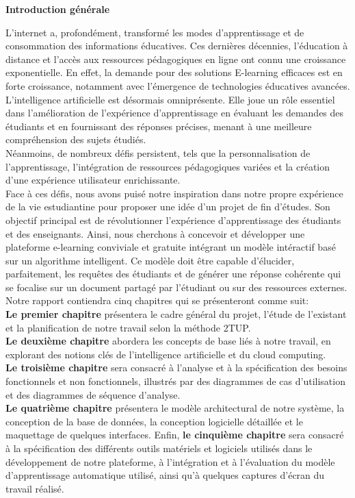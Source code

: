 \thispagestyle{empty}
\begin{center}
  \textbf{\Huge Introduction générale}
\end{center}

\noindent L'internet a, profondément, transformé les modes d'apprentissage et de consommation des informations éducatives. Ces dernières décennies, l'éducation à distance et l'accès aux ressources pédagogiques en ligne ont connu une croissance exponentielle. En effet, la demande pour des solutions E-learning efficaces est en forte croissance, notamment avec l'émergence de technologies éducatives avancées. L’intelligence artificielle est désormais omniprésente. Elle joue un rôle essentiel dans l'amélioration de l'expérience d'apprentissage en évaluant les demandes des étudiants et en fournissant des réponses précises, menant à une meilleure compréhension des sujets étudiés.\\
\noindent Néanmoins, de nombreux défis persistent, tels que la personnalisation de l'apprentissage, l'intégration de ressources pédagogiques variées et la création d'une expérience utilisateur enrichissante. \\
\noindent Face à ces défis, nous avons puisé notre inspiration dans notre propre expérience de la vie estudiantine pour proposer une idée d’un projet de fin d’études. Son objectif principal est de révolutionner l'expérience d'apprentissage des étudiants et des enseignants. Ainsi, nous cherchons à concevoir et développer une plateforme e-learning conviviale et gratuite intégrant un modèle intéractif basé sur un algorithme intelligent. Ce modèle doit être capable d'élucider, parfaitement, les requêtes des étudiants et de générer une réponse cohérente qui se focalise sur un document partagé par l’étudiant ou sur des ressources externes. \\
\noindent Notre rapport contiendra cinq chapitres qui se présenteront comme suit: \\
\textbf{Le premier chapitre} présentera le cadre général du projet, l'étude de l'existant et la planification de notre travail selon la méthode 2TUP.\\
\textbf{Le deuxième chapitre} abordera les concepts de base liés à notre travail, en explorant des notions clés de l'intelligence artificielle et du cloud computing.\\
\textbf{Le troisième chapitre} sera consacré à l'analyse et à la spécification des besoins fonctionnels et non fonctionnels, illustrés par des diagrammes de cas d'utilisation et des diagrammes de séquence d'analyse.\\
\textbf{Le quatrième chapitre} présentera le modèle architectural de notre système, la conception de la base de données, la conception logicielle détaillée et le maquettage de quelques interfaces. Enfin, \textbf{le cinquième chapitre} sera consacré à la spécification des différents outils matériels et logiciels utilisés dans le développement de notre plateforme, à l'intégration et à l'évaluation du modèle d’apprentissage automatique utilisé, ainsi qu'à quelques captures d'écran du travail réalisé.